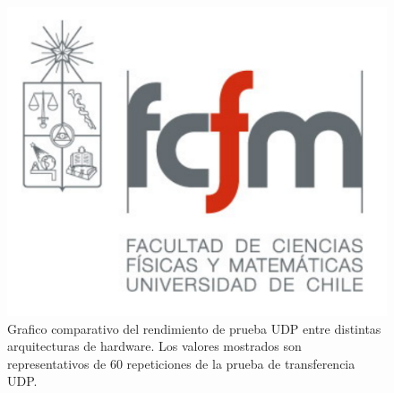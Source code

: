 \begin{figure}[h!]
	\centering
	\includegraphics[scale=0.3]{imagenes/fcfm}
	\caption{Grafico comparativo del rendimiento de prueba UDP entre distintas arquitecturas de hardware. Los valores mostrados son representativos de 60 repeticiones de la prueba de transferencia UDP.}
	\label{fig:tests_arch}
\end{figure}

